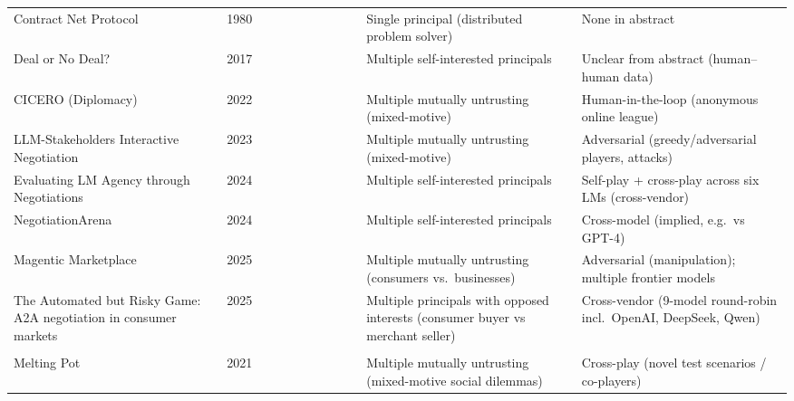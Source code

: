 \documentclass[conference]{IEEEtran}
\newcommand{\full}{{\small\CIRCLE}}
\newcommand{\half}{{\small\LEFTcircle}}
\newcommand{\none}{{\small\Circle}}
\begin{document}
{\begin{longtable}{>{\raggedright\arraybackslash}p{4.2cm} c cccccccc >{\raggedright\arraybackslash}p{3.6cm} >{\raggedright\arraybackslash}p{4.4cm}}
Contract Net Protocol \cite{smith1980contractnet} & 1980 & \none{} & \half{} & \half{} & \none{} & \none{} & \none{} & \none{} & \none{} & Single principal (distributed problem solver) & None in abstract \\
Deal or No Deal? \cite{lewis2017dealnodeal} & 2017 & \none{} & \none{} & \half{} & \none{} & \none{} & \none{} & \none{} & \none{} & Multiple self-interested principals & Unclear from abstract (human--human data) \\
CICERO (Diplomacy) \cite{fair2022cicero} & 2022 & \full{} & \none{} & \half{} & \none{} & \none{} & \none{} & \none{} & \none{} & Multiple mutually untrusting (mixed-motive) & Human-in-the-loop (anonymous online league) \\
LLM-Stakeholders Interactive Negotiation \cite{abdelnabi2024stakeholders} & 2023 & \none{} & \none{} & \half{} & \none{} & \none{} & \none{} & \none{} & \full{} & Multiple mutually untrusting (mixed-motive) & Adversarial (greedy/adversarial players, attacks) \\
Evaluating LM Agency through Negotiations \cite{davidson2024agency} & 2024 & \full{} & \none{} & \half{} & \none{} & \none{} & \none{} & \none{} & \none{} & Multiple self-interested principals & Self-play + cross-play across six LMs (cross-vendor) \\
NegotiationArena \cite{bianchi2024negotiationarena} & 2024 & \half{} & \none{} & \half{} & \none{} & \none{} & \none{} & \none{} & \half{} & Multiple self-interested principals & Cross-model (implied, e.g.~vs GPT-4) \\
Magentic Marketplace \cite{bansal2025marketplace} & 2025 & \half{} & \none{} & \half{} & \none{} & \none{} & \none{} & \none{} & \full{} & Multiple mutually untrusting (consumers vs.~businesses) & Adversarial (manipulation); multiple frontier models \\
The Automated but Risky Game: A2A negotiation in consumer markets \cite{zhu2025riskygame} & 2025 & \full{} & \none{} & \full{} & \none{} & \half{} & \none{} & \none{} & \half{} & Multiple principals with opposed interests (consumer buyer vs merchant seller) & Cross-vendor (9-model round-robin incl.~OpenAI, DeepSeek, Qwen) \\
\multicolumn{12}{l}{\textit{LLM-MAS frameworks/benchmarks}} \\
Melting Pot \cite{leibo2021meltingpot} & 2021 & \full{} & \none{} & \none{} & \none{} & \none{} & \none{} & \none{} & \none{} & Multiple mutually untrusting (mixed-motive social dilemmas) & Cross-play (novel test scenarios / co-players) \\

\end{longtable}}
\end{document}
